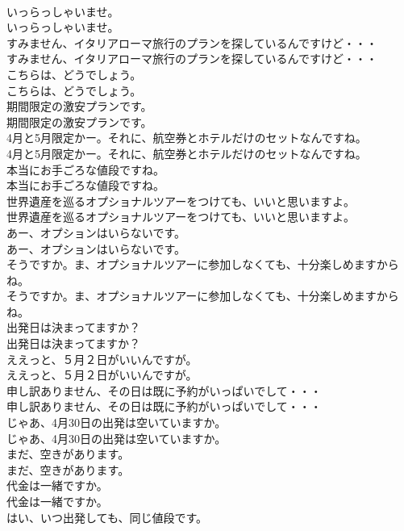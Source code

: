 \documentclass[8pt]{extreport}
\begin{document}
\begin{CJK}{UTF8}{min}
\\	いっらっしゃいませ。	
\\	いっらっしゃいませ。 
\\	すみません、イタリアローマ旅行のプランを探しているんですけど・・・	
\\	すみません、イタリアローマ旅行のプランを探しているんですけど・・・ 
\\	こちらは、どうでしょう。	
\\	こちらは、どうでしょう。 
\\	期間限定の激安プランです。	
\\	期間限定の激安プランです。 
\\	4月と5月限定かー。それに、航空券とホテルだけのセットなんですね。	
\\	4月と5月限定かー。それに、航空券とホテルだけのセットなんですね。 
\\	本当にお手ごろな値段ですね。	
\\	本当にお手ごろな値段ですね。 
\\	世界遺産を巡るオプショナルツアーをつけても、いいと思いますよ。	
\\	世界遺産を巡るオプショナルツアーをつけても、いいと思いますよ。 
\\	あー、オプションはいらないです。	
\\	あー、オプションはいらないです。 
\\	そうですか。ま、オプショナルツアーに参加しなくても、十分楽しめますからね。	
\\	そうですか。ま、オプショナルツアーに参加しなくても、十分楽しめますからね。 
\\	出発日は決まってますか？	
\\	出発日は決まってますか？ 
\\	ええっと、５月２日がいいんですが。	
\\	ええっと、５月２日がいいんですが。 
\\	申し訳ありません、その日は既に予約がいっぱいでして・・・	
\\	申し訳ありません、その日は既に予約がいっぱいでして・・・ 
\\	じゃあ、4月30日の出発は空いていますか。	
\\	じゃあ、4月30日の出発は空いていますか。 
\\	まだ、空きがあります。	
\\	まだ、空きがあります。 
\\	代金は一緒ですか。	
\\	代金は一緒ですか。 
\\	はい、いつ出発しても、同じ値段です。	

\end{CJK}
\end{document}
